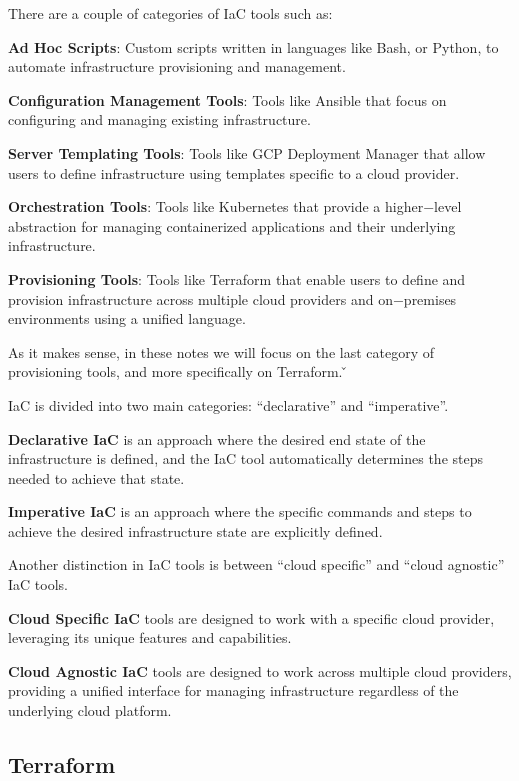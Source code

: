 There are a couple of categories of IaC tools such as:
\bit
\item \textbf{Ad Hoc Scripts}: Custom scripts written in languages like Bash, or Python, to automate infrastructure
provisioning and management.
\item \textbf{Configuration Management Tools}: Tools like Ansible that focus on configuring and managing existing
infrastructure.
\item \textbf{Server Templating Tools}: Tools like GCP Deployment Manager that allow users to define infrastructure
using templates specific to a cloud provider.
\item \textbf{Orchestration Tools}: Tools like Kubernetes that provide a higher$-$level abstraction for managing
containerized applications and their underlying infrastructure.
\item \textbf{Provisioning Tools}: Tools like Terraform that enable users to define and provision infrastructure across
multiple cloud providers and on$-$premises environments using a unified language.
\eit

As it makes sense, in these notes we will focus on the last category of provisioning tools, and more specifically on
Terraform. \v \newpage

IaC is divided into two main categories: ``declarative'' and ``imperative''.

\textbf{Declarative IaC} is an approach where the desired end state of the infrastructure is defined, and the IaC tool
automatically determines the steps needed to achieve that state.
\ed

\textbf{Imperative IaC} is an approach where the specific commands and steps to achieve the desired infrastructure state
are explicitly defined.
\ed

Another distinction in IaC tools is between ``cloud specific'' and ``cloud agnostic'' IaC tools.

\textbf{Cloud Specific IaC} tools are designed to work with a specific cloud provider, leveraging its unique features
and capabilities.
\ed

\textbf{Cloud Agnostic IaC} tools are designed to work across multiple cloud providers, providing a unified interface
for managing infrastructure regardless of the underlying cloud platform.
\ed

\subsection{Terraform}

